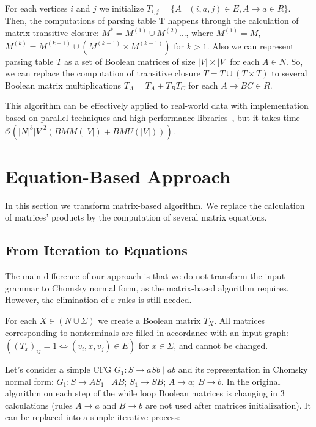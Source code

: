 \documentclass[sigconf]{acmart}
\begin{document}
For each vertices $i$ and $j$ we initialize $T_{i,j} = \{A \mid (i, a, j) \in E, A \rightarrow a \in R\}$. 
Then, the computations of parsing table T happens through the calculation of matrix transitive closure: $M^* = M^{(1)} \cup M^{(2)} \dots$, where $M^{(1)} = M$, $M^{(k)} = M^{(k-1)} \cup (M^{(k-1)} \times M^{(k-1)})$ for $k > 1$.
Also we can represent parsing table $T$ as a set of Boolean matrices of size $|V| \times |V|$ for each $A \in N$. So, we can replace the computation of transitive closure $T = T \cup (T \times T)$ to several Boolean matrix multiplications $T_A = T_A + T_B T_C$ for each $A \rightarrow BC \in R$.

This algorithm can be effectively applied to real-world data with implementation based on parallel techniques and high-performance libraries~\cite{mishin2019evaluation}, but it takes time $\mathcal{O}(|N|^3|V|^2(BMM(|V|) + BMU(|V|)))$. 


\section{Equation-Based Approach}

In this section we transform matrix-based algorithm. 
We replace the calculation of matrices' products by the computation of several matrix equations.

\subsection{From Iteration to Equations}

The main difference of our approach is that we do not transform the input grammar to Chomsky normal form, as the matrix-based algorithm requires. 
However, the elimination of $\varepsilon$-rules is still needed.

For each $X \in (N \cup \Sigma)$ we create a Boolean matrix $T_X$. 
All matrices corresponding to nonterminals are filled in accordance with an input graph: $((T_x)_{ij} = 1 \iff (v_i, x, v_j) \in E)$ for  $x \in \Sigma$, and cannot be changed. 


Let's consider a simple CFG $G_1 : S \rightarrow aSb \mid ab$ and its representation in Chomsky normal form: $G_1 : S \rightarrow AS_1 \mid AB$; $ S_1 \rightarrow SB$; $ A \rightarrow a$; $B \rightarrow b$.
In the original algorithm on each step of the while loop Boolean matrices is changing in 3 calculations (rules $ A \rightarrow a$ and $B \rightarrow b$ are not used after matrices initialization). It can be replaced into a simple iterative process:
\end{document}
